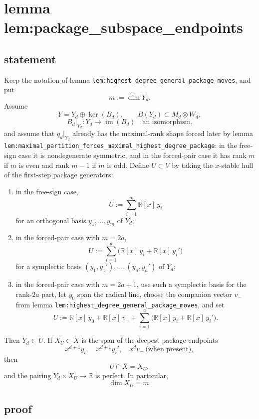 \documentclass[
]{article}
\providecommand{\tightlist}{%
  \setlength{\itemsep}{0pt}\setlength{\parskip}{0pt}}
\begin{document}
\section{lemma
lem:package\_subspace\_endpoints}\label{lemma-lempackage_subspace_endpoints}

\subsection{statement}\label{statement-16}

Keep the notation of lemma
\texttt{lem:highest\_degree\_general\_package\_moves}, and put \[
m:=\dim Y_d.
\] Assume \[
Y=Y_d\oplus \ker(B_d),
\qquad
B(Y_d)\subset M_d\otimes W_d,
\] \[
B_d|_{Y_d}:Y_d\to \operatorname{im}(B_d)
\quad\text{an isomorphism,}
\] and assume that \(q_d|_{Y_d}\) already has the maximal-rank shape
forced later by lemma
\texttt{lem:maximal\_partition\_forces\_maximal\_highest\_degree\_package}:
in the free-sign case it is nondegenerate symmetric, and in the
forced-pair case it has rank \(m\) if \(m\) is even and rank \(m-1\) if
\(m\) is odd. Define \(U\subset V\) by taking the \(x\)-stable hull of
the first-step package generators:

\begin{enumerate}
\def\labelenumi{\arabic{enumi}.}
\tightlist
\item
  in the free-sign case, \[
  U:=\sum_{i=1}^m \mathbb R[x]\,y_i
  \] for an orthogonal basis \(y_1,\dots,y_m\) of \(Y_d\);
\item
  in the forced-pair case with \(m=2a\), \[
  U:=\sum_{i=1}^a \bigl(\mathbb R[x]\,y_i+\mathbb R[x]\,y_i'\bigr)
  \] for a symplectic basis \((y_1,y_1'),\dots,(y_a,y_a')\) of \(Y_d\);
\item
  in the forced-pair case with \(m=2a+1\), use such a symplectic basis
  for the rank-\(2a\) part, let \(y_0\) span the radical line, choose
  the companion vector \(v_-\) from lemma
  \texttt{lem:highest\_degree\_general\_package\_moves}, and set \[
  U:=\mathbb R[x]\,y_0+\mathbb R[x]\,v_-+\sum_{i=1}^a \bigl(\mathbb R[x]\,y_i+\mathbb R[x]\,y_i'\bigr).
  \]
\end{enumerate}

Then \(Y_d\subset U\). If \(X_U\subset X\) is the span of the deepest
package endpoints \[
x^{d+1}y_i,\quad x^{d+1}y_i',\quad x^d v_-\ \text{(when present)},
\] then \[
U\cap X=X_U,
\] and the pairing \(Y_d\times X_U\to\mathbb R\) is perfect. In
particular, \[
\dim X_U=m.
\]

\subsection{proof}\label{proof-16}
\end{document}
